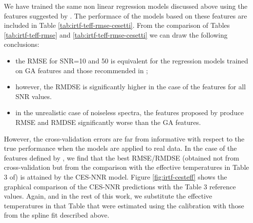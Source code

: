 
We have trained the same non linear regression models discussed above
using the features suggested by \cite{cesetti}. The performace of the
models based on these features are included in Table
\ref{tab:irtf-teff-rmse-cesetti}. From the comparison of Tables
\ref{tab:irtf-teff-rmse} and
\ref{tab:irtf-teff-rmse-cesetti} we can draw the following conclusions:

\begin{itemize}

\item the RMSE for SNR=10 and 50 is equivalent for the regression
  models trained on GA features and those recommended
  in \cite{cesetti};

\item however, the RMDSE is significantly higher
  in the case of the \cite{cesetti} features for all SNR values.

\item in the unrealistic case of noiseless spectra, the features proposed
  by \cite{cesetti} produce RMSE and RMDSE significantly worse than
  the GA features.

\end{itemize}

However, the cross-validation errors are far from informative with
respect to the true performance when the models are applied to real
data. In the case of the features defined by \cite{cesetti}, we find
that the best RMSE/RMDSE (obtained not from cross-validation but from
the comparison with the effective temperatures in Table 3
of\cite{cesetti}) is attained by the CES-NNR
model. Figure \ref{fig:irtf-cesteff} shows the graphical comparison of
the CES-NNR predictions with the Table 3 reference values. Again, and
in the rest of this work, we substitute the effective temperatures in
that Table that were estimated using the \cite{1996imsa.book.....O}
calibration with those from the spline fit described above.

